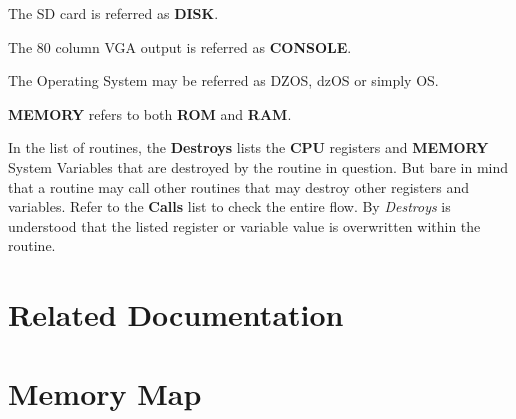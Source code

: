 \documentclass[a4paper,11pt]{article}
\begin{document}
    The SD card is referred as \textbf{DISK}.

    The 80 column VGA output is referred as \textbf{CONSOLE}.
    
    The Operating System may be referred as DZOS, dzOS or simply OS.

    \textbf{MEMORY} refers to both \textbf{ROM} and \textbf{RAM}.

    In the list of routines, the \textbf{Destroys} lists the \textbf{CPU}
    registers and \textbf{MEMORY} System Variables that are destroyed by the
    routine in question. But bare in mind that a routine may call other routines
    that may destroy other registers and variables. Refer to the \textbf{Calls}
    list to check the entire flow. By \textit{Destroys} is understood that the
    listed register or variable value is overwritten within the routine.

    \pagebreak
    \section*{Related Documentation}
    \hspace{1cm}{\LARGE dastaZ80 User's Manual}
    
    \hspace{1cm}{\LARGE dastaZ80 Technical Reference Manual}

    \hspace{1cm}{\LARGE https://github.com/dasta400/dzOS}

    \pagebreak
    \tableofcontents

    \pagebreak
    \pagestyle{fancy}
    \fancyhf{}
    \fancyfoot[R]{\thepage}
    \setcounter{page}{1}
    \section{Memory Map}
    
\end{document}
